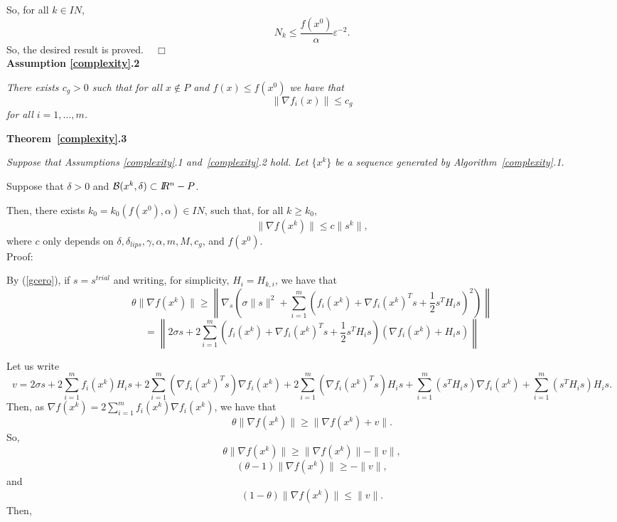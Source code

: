 \documentclass{article}
\newcommand{\half}      {\frac{1}{2}}
\newcommand{\N}         {I\!\!N}
\newcommand{\R}         {I\!\!R}
\newcommand{\halmos}    {\hfill $\;\;\;\Box$\\}
\newcommand{\s}{s^{trial}}
\newcommand{\B}{{\cal B}}
\begin{document}
So, for all $k \in \N$,
\[
 N_k \leq \frac{f(x^0)}{\alpha} \varepsilon^{-2}.
\]
So, the desired result is proved. \halmos




 
\noindent
{\bf Assumption \ref{complexity}.2}
   
{\it There exists $c_g > 0$ such that for all $x \notin P$ and $f(x) \leq f(x^0)$ we have that 
\begin{equation} \label{boundg}
  \|\nabla f_i(x)\| \leq c_g
\end{equation}
 for all $i = 1, \ldots, m$. \\
}    

\noindent
{\bf Theorem~\ref{complexity}.3} {\it Suppose that Assumptions \ref{complexity}.1 and~\ref{complexity}.2 hold. Let
  $\{x^k\}$ be a sequence generated by Algorithm~\ref{complexity}.1.  

  Suppose that $\delta > 0$ and $\B(x^k, \delta) \subset \R^{n} - P$. 

  Then, there exists $k_0 = k_0(f(x^0), \alpha) \in \N$, such that, for all $k \geq k_0$, 
 \begin{equation} \label{gsk}
\|\nabla f(x^k)\| \leq c \|s^k\|,
\end{equation}
where $c$ only depends on $\delta, \delta_{lips}, \gamma, \alpha, m, M, c_g$, and $f(x^0)$.\\

 

\noindent
Proof:} By (\ref{gcero}), if $s = \s$ and writing, for simplicity, $H_i = H_{k,i}$, we have that
\[
\theta \|\nabla f(x^k)\| \geq  \left\| \nabla_s \left(\sigma \|s\|^2 +
 \sum_{i=1}^m (f_i(x^k) + \nabla f_i(x^k)^T s + \half s^T H_i s)^2 \right) \right\| 
\]
\[
= \left\|  2 \sigma s + 2 \sum_{i=1}^m \left( f_i(x^k) + \nabla f_i(x^k)^T s + \frac{1}{2} s^T H_i s \right) \left( \nabla f_i(x^k) + H_i s \right)
 \right\|
\]     

Let us write
\begin{equation} \label{eta}
v =   2 \sigma s + 2 \sum_{i=1}^m f_i(x^k) H_i s +
 2 \sum_{i=1}^m (\nabla f_i(x^k)^T s) \nabla f_i(x^k) 
+ 2 \sum_{i=1}^m (\nabla f_i(x^k)^T s) H_i s + \sum_{i=1}^m (s^T H_i s) \nabla f_i(x^k) + \sum_{i=1}^m (s^T H_i s) H_i s. 
\end{equation}
 Then, as $\nabla f(x^k) = 2 \sum_{i=1}^m f_i(x^k) \nabla f_i(x^k)$, we have that 
\[
\theta \|\nabla f(x^k)\| 
\geq \| \nabla f(x^k)  
 + v \|. 
\]
So, 
\[
\theta \|\nabla f(x^k)\| \geq \|\nabla f(x^k)\| - \|v\|,
\]
\[
(\theta - 1) \|\nabla f(x^k)\| \geq -\|v\|,
\]
and
\[
(1-\theta) \|\nabla f(x^k)\| \leq \|v\|.
\]
Then, 
\end{document}
